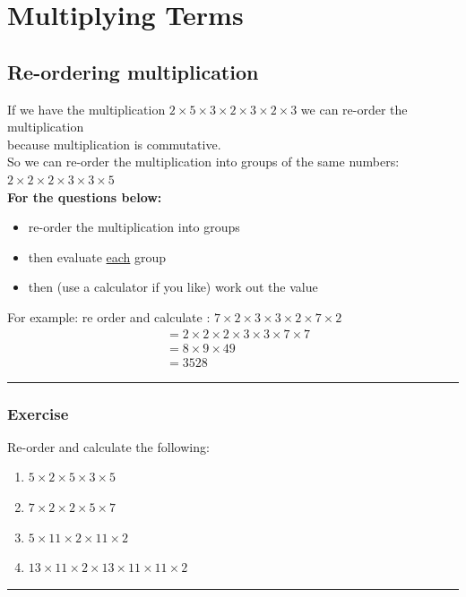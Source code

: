 \documentclass[a4paper,12pt]{article}
\newcommand\question{
	 \rule[0pt]{17cm}{0.5pt}\vspace{-0.5cm}
	\subsubsection{Exercise}

}
\newcommand\questionend{
	\rule[0pt]{17cm}{0.5pt}\vspace{0.0cm}\\
}
\begin{document}
\section{Multiplying Terms}
\subsection{Re-ordering multiplication}
If we have the multiplication $2 \times 5 \times 3 \times 2 \times 3 \times 2 \times 3$ we can re-order the multiplication \\
because multiplication is commutative.\\
So we can re-order the multiplication into groups of the same numbers: $2 \times 2 \times 2 \times 3 \times 3 \times 5$\\
\textbf{For the questions below:}
\begin{itemize}
	\item re-order the multiplication into groups
	\item then evaluate \underline{each} group
	\item then (use a calculator if you like) work out the value
\end{itemize}
For example: re order and calculate : $7 \times 2 \times 3 \times 3 \times 2 \times 7 \times 2$ 
\begin{align*}
&=  2 \times 2 \times 2 \times 3 \times 3 \times 7 \times 7\\
&=  8 \times 9\times 49\\
&= 3528
\end{align*}
\question
Re-order and calculate the following:
\begin{multicols}{2}
\begin{enumerate}[label=\normalsize \alph*)~~~]
	\item $5 \times 2 \times 5 \times 3 \times 5$
		\item $7 \times 2 \times 2 \times 5 \times 7$
			\item $5 \times 11 \times 2 \times 11 \times 2$
			\item $13 \times 11 \times 2 \times 13 \times 11 \times 11 \times 2$
\end{enumerate}
\end{multicols}
\questionend
\end{document}
